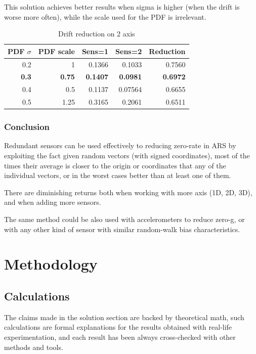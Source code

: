 \documentclass[10pt, twocolumn, a4paper]{article}
\begin{document}
            This solution achieves better results when sigma is higher (when the drift is worse more often), while the scale used for the PDF is irrelevant.
            \begin{table}[H]
                \caption{Drift reduction on 2 axis}
                \vspace{2mm}
                \begin{tabular}{|r|r|r|r|r|}
                    \hline
                        PDF $\sigma$ & PDF scale & Sens=1 & Sens=2 & Reduction \\
                    \hline
                        0.2 & 1    & 0.1366 & 0.1033  & 0.7560 \\
                        \textbf{0.3} & \textbf{0.75} & \textbf{0.1407} & \textbf{0.0981} & \textbf{0.6972} \\
                        0.4 & 0.5  & 0.1137 & 0.07564 & 0.6655 \\
                        0.5 & 1.25 & 0.3165 & 0.2061  & 0.6511 \\
                    \hline
                \end{tabular}
            \end{table}

        \subsubsection{Conclusion}
            Redundant sensors can be used effectively to reducing zero-rate in ARS by exploiting the fact given random vectors (with signed coordinates), most of the times their average is closer to the origin or coordinates that any of the individual vectors, or in the worst cases better than at least one of them.

            There are diminishing returns both when working with more axis (1D, 2D, 3D), and when adding more sensors.

            The same method could be also used with accelerometers to reduce zero-g, or with any other kind of sensor with similar random-walk bias characteristics.


\section{Methodology}
    \subsection{Calculations}
    The claims made in the solution section are backed by theoretical math, such calculations are formal explanations for the results obtained with real-life experimentation, and each result has been always cross-checked with other methods and tools.
\end{document}
